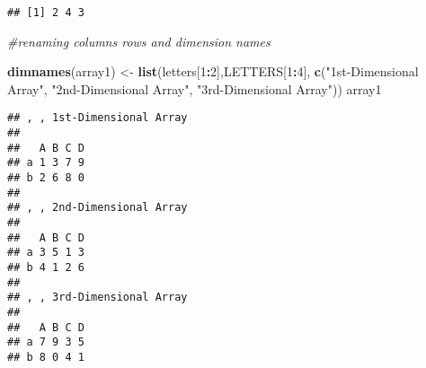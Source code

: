 \documentclass[
]{article}
\newenvironment{Shaded}{\begin{snugshade}}{\end{snugshade}}
\newcommand{\CommentTok}[1]{\textcolor[rgb]{0.56,0.35,0.01}{\textit{#1}}}
\newcommand{\DecValTok}[1]{\textcolor[rgb]{0.00,0.00,0.81}{#1}}
\newcommand{\FunctionTok}[1]{\textcolor[rgb]{0.13,0.29,0.53}{\textbf{#1}}}
\newcommand{\NormalTok}[1]{#1}
\newcommand{\OtherTok}[1]{\textcolor[rgb]{0.56,0.35,0.01}{#1}}
\newcommand{\SpecialCharTok}[1]{\textcolor[rgb]{0.81,0.36,0.00}{\textbf{#1}}}
\newcommand{\StringTok}[1]{\textcolor[rgb]{0.31,0.60,0.02}{#1}}
\begin{document}
\begin{verbatim}
## [1] 2 4 3
\end{verbatim}

\begin{Shaded}
\begin{Highlighting}[]
\CommentTok{\#renaming columns rows and dimension names}

\FunctionTok{dimnames}\NormalTok{(array1) }\OtherTok{\textless{}{-}} \FunctionTok{list}\NormalTok{(letters[}\DecValTok{1}\SpecialCharTok{:}\DecValTok{2}\NormalTok{],LETTERS[}\DecValTok{1}\SpecialCharTok{:}\DecValTok{4}\NormalTok{], }\FunctionTok{c}\NormalTok{(}\StringTok{"1st{-}Dimensional Array"}\NormalTok{, }\StringTok{"2nd{-}Dimensional Array"}\NormalTok{, }\StringTok{"3rd{-}Dimensional Array"}\NormalTok{))}
\NormalTok{array1}
\end{Highlighting}
\end{Shaded}

\begin{verbatim}
## , , 1st-Dimensional Array
## 
##   A B C D
## a 1 3 7 9
## b 2 6 8 0
## 
## , , 2nd-Dimensional Array
## 
##   A B C D
## a 3 5 1 3
## b 4 1 2 6
## 
## , , 3rd-Dimensional Array
## 
##   A B C D
## a 7 9 3 5
## b 8 0 4 1
\end{verbatim}
\end{document}
